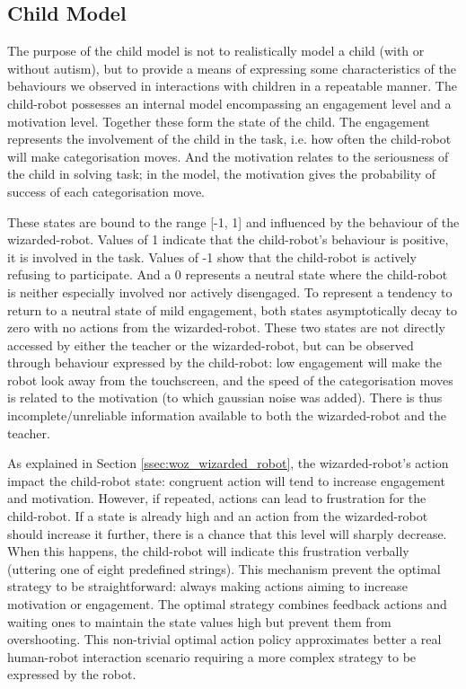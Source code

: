 \subsection{Child Model} \label{ssec:woz_child}

The purpose of the child model is not to realistically model a child (with or without autism), but to provide a means of expressing some characteristics of the behaviours we observed in interactions with children in a repeatable manner. The child-robot possesses an internal model encompassing an engagement level and a motivation level. Together these form the state of the child. The engagement represents the involvement of the child in the task, i.e. how often the child-robot will make categorisation moves. And the motivation relates to the seriousness of the child in solving task; in the model, the motivation gives the probability of success of each categorisation move. 

These states are bound to the range [-1, 1] and influenced by the behaviour of the wizarded-robot. Values of 1 indicate that the child-robot's behaviour is positive, it is involved in the task. Values of -1 show that the child-robot is actively refusing to participate. And a 0 represents a neutral state where the child-robot is neither especially involved nor actively disengaged. To represent a tendency to return to a neutral state of mild engagement, both states asymptotically decay to zero with no actions from the wizarded-robot. These two states are not directly accessed by either the teacher or the wizarded-robot, but can be observed through behaviour expressed by the child-robot: low engagement will make the robot look away from the touchscreen, and the speed of the categorisation moves is related to the motivation (to which gaussian noise was added). There is thus incomplete/unreliable information available to both the wizarded-robot and the teacher.

As explained in Section \ref{ssec:woz_wizarded_robot}, the wizarded-robot's action impact the child-robot state: congruent action will tend to increase engagement and motivation. However, if repeated, actions can lead to frustration for the child-robot. If a state is already high and an action from the wizarded-robot should increase it further, there is a chance that this level will sharply decrease. When this happens, the child-robot will indicate this frustration verbally (uttering one of eight predefined strings). This mechanism prevent the optimal strategy to be straightforward: always making actions aiming to increase motivation or engagement. The optimal strategy combines feedback actions and waiting ones to maintain the state values high but prevent them from overshooting. This non-trivial optimal action policy approximates better a real human-robot interaction scenario requiring a more complex strategy to be expressed by the robot.

